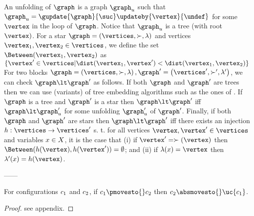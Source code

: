 An unfolding of $\graph$ is a graph $\graph_u$ such that
$\graph_u=\gupdate{\graph}{\suc}\updateby{\vertex}{\undef}$
for some $\vertex$ in the loop of $\graph$.
%
Notice that $\graph_u$ is a tree (with root $\vertex)$.
%
For a star $\graph=\tuple{\vertices,\succ,\labeling}$ and vertices $\vertex_1,\vertex_2 \in \vertices$, we define the set $\Between(\vertex_1, \vertex_2)$ as $\{\vertex' \in \vertices | \dist(\vertex_1,\vertex') < \dist(\vertex_1,\vertex_2)\}$
%
For two blocks $\graph=\tuple{\vertices,\succ,\labeling},\graph'=\tuple{\vertices',\succ',\labeling'}$, we can check
$\graph\lt\graph'$ as follows.
%
If both $\graph$ and $\graph'$ are trees then we can use (variants)
of tree embedding algorithms such as the ones of \cite{DBLP:journals/jda/Valiente05, Kilpelainen95Ordered}.
%
If $\graph$ is a tree and $\graph'$ is a star then
$\graph\lt\graph'$ iff $\graph\lt\graph'_u$ for some unfolding $\graph'_u$ of $\graph'$.
%
Finally, if both $\graph$ and $\graph'$ are stars then
$\graph\lt\graph'$ iff there exists an injection $h : \vertices \to \vertices'$ s. t. for all vertices $\vertex,\vertex'\in\vertices$ and variables $x\in X$,
it is the case that
(i) if $\vertex'=\succ(\vertex)$ then $\Between(h(\vertex),h(\vertex')) = \emptyset$; and
(ii) if $\labeling(\xvar)=\vertex$ then $\labeling'(\xvar)=h(\vertex)$.
%




------



\noindent
\begin{minipage}{0.65\textwidth}

\begin{lemma}
\label{backwards:implies:forwards:lemma}
For configurations $c_1$ and $c_2$, if $\conf_1\pmovesto{}\conf_2$
then $\conf_2\absmovesto{}\uc{\conf_1}$.
\end{lemma}
\begin{proof}
see appendix.
\end{proof}
\end{minipage}
\begin{minipage}{0.3\textwidth}
\hfill%
\end{minipage}





